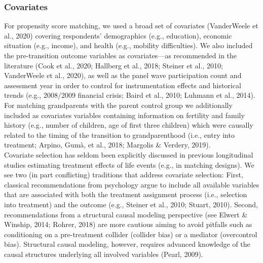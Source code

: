 \documentclass[
  english,
  man, noextraspace]{apa7}
\begin{document}
\hypertarget{covariates}{%
\subsubsection{Covariates}\label{covariates}}

For propensity score matching, we used a broad set of covariates (VanderWeele et al., 2020) covering respondents' demographics (e.g., education), economic situation (e.g., income), and health (e.g., mobility difficulties). We also included the pre-transition outcome variables as covariates---as recommended in the literature (Cook et al., 2020; Hallberg et al., 2018; Steiner et al., 2010; VanderWeele et al., 2020), as well as the panel wave participation count and assessment year in order to control for instrumentation effects and historical trends (e.g., 2008/2009 financial crisis; Baird et al., 2010; Luhmann et al., 2014). For matching grandparents with the parent control group we additionally included as covariates variables containing information on fertility and family history (e.g., number of children, age of first three children) which were causally related to the timing of the transition to grandparenthood (i.e., entry into treatment; Arpino, Gumà, et al., 2018; Margolis \& Verdery, 2019).\\
Covariate selection has seldom been explicitly discussed in previous longitudinal studies estimating treatment effects of life events (e.g., in matching designs). We see two (in part conflicting) traditions that address covariate selection: First, classical recommendations from psychology argue to include all available variables that are associated with both the treatment assignment process (i.e., selection into treatment) and the outcome (e.g., Steiner et al., 2010; Stuart, 2010). Second, recommendations from a structural causal modeling perspective (see Elwert \& Winship, 2014; Rohrer, 2018) are more cautious aiming to avoid pitfalls such as conditioning on a pre-treatment collider (collider bias) or a mediator (overcontrol bias). Structural causal modeling, however, requires advanced knowledge of the causal structures underlying all involved variables (Pearl, 2009).\\
\end{document}

